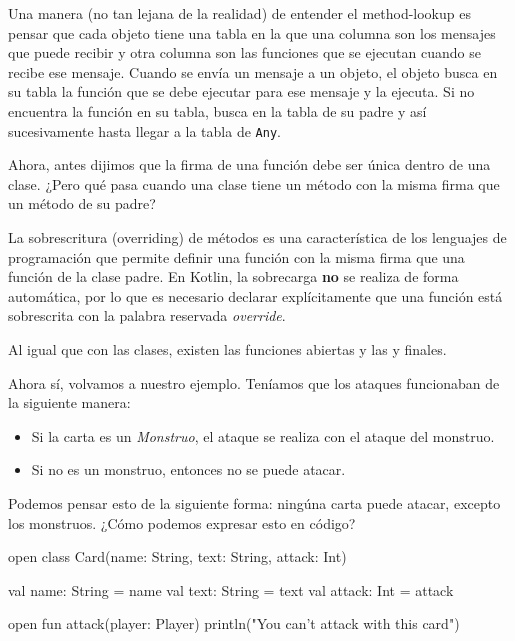  Una manera (no tan lejana de la realidad) de entender el method-lookup es pensar que cada objeto
  tiene una tabla en la que una columna son los mensajes que puede recibir y otra columna son las
  funciones que se ejecutan cuando se recibe ese mensaje.
  Cuando se envía un mensaje a un objeto, el objeto busca en su tabla la función que se debe
  ejecutar para ese mensaje y la ejecuta.
  Si no encuentra la función en su tabla, busca en la tabla de su padre y así sucesivamente hasta
  llegar a la tabla de \texttt{Any}.
  
  Ahora, antes dijimos que la firma de una función debe ser única dentro de una clase.
  ¿Pero qué pasa cuando una clase tiene un método con la misma firma que un método de su padre?

  \begin{defaultbox}
    La sobrescritura (overriding) de métodos es una característica 
    de los lenguajes de programación que permite definir una función con la misma firma que una 
    función de la clase padre.
    En Kotlin, la sobrecarga \textbf{no} se realiza de forma automática, por lo que es necesario
    declarar explícitamente que una función está sobrescrita con la palabra reservada
    \textit{override}.
  \end{defaultbox}

  \begin{note}
    Al igual que con las clases, existen las funciones abiertas y las
     y finales.
  \end{note}

  Ahora sí, volvamos a nuestro ejemplo.
  Teníamos que los ataques funcionaban de la siguiente manera:

  \begin{itemize}
    \item Si la carta es un \textit{Monstruo}, el ataque se realiza con el ataque del monstruo.
    \item Si no es un monstruo, entonces no se puede atacar.
  \end{itemize}

  Podemos pensar esto de la siguiente forma: ningúna carta puede atacar, excepto los monstruos.
  ¿Cómo podemos expresar esto en código?

  \begin{kotlin}
    open class Card(name: String, text: String, attack: Int) {
      val name: String = name
      val text: String = text
      val attack: Int = attack

      open fun attack(player: Player) {
        println("You can't attack with this card")
      }
    }
  \end{kotlin}

